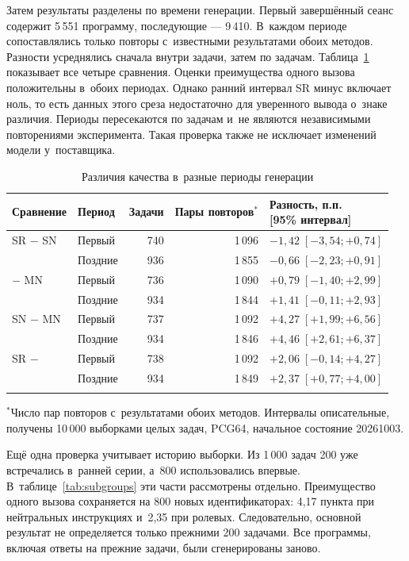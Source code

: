 Затем результаты разделены по времени генерации. Первый завершённый сеанс содержит 5\,551 программу, последующие --- 9\,410. В~каждом периоде сопоставлялись только повторы с~известными результатами обоих методов. Разности усреднялись сначала внутри задачи, затем по задачам. Таблица~\ref{tab:temporal} показывает все четыре сравнения. Оценки преимущества одного вызова положительны в~обоих периодах. Однако ранний интервал SR минус \MultiCallRole{} включает ноль, то есть данных этого среза недостаточно для уверенного вывода о~знаке различия. Периоды пересекаются по задачам и~не являются независимыми повторениями эксперимента. Такая проверка также не исключает изменений модели у~поставщика.

\begin{table}[htbp]
\caption{Различия качества в~разные периоды генерации}
\label{tab:temporal}
\centering\small\setlength{\tabcolsep}{4pt}
\begin{tabular}{@{}llrrl@{}}
\toprule
Сравнение & Период & Задачи & \shortstack{Пары\\повторов$^*$} & \shortstack{Разность, п.п.\\{}[95\% интервал]} \\
\midrule
SR $-$ SN & Первый & 740 & 1\,096 & $-1{,}42\;[-3{,}54;+0{,}74]$ \\
 & Поздние & 936 & 1\,855 & $-0{,}66\;[-2{,}23;+0{,}91]$ \\
\MultiCallRole{} $-$ MN & Первый & 736 & 1\,090 & $+0{,}79\;[-1{,}40;+2{,}99]$ \\
 & Поздние & 934 & 1\,844 & $+1{,}41\;[-0{,}11;+2{,}93]$ \\
SN $-$ MN & Первый & 737 & 1\,092 & $+4{,}27\;[+1{,}99;+6{,}56]$ \\
 & Поздние & 934 & 1\,846 & $+4{,}46\;[+2{,}61;+6{,}37]$ \\
SR $-$ \MultiCallRole{} & Первый & 738 & 1\,092 & $+2{,}06\;[-0{,}14;+4{,}27]$ \\
 & Поздние & 934 & 1\,849 & $+2{,}37\;[+0{,}77;+4{,}00]$ \\
\botrule
\end{tabular}
\par\smallskip\raggedright\footnotesize $^*$Число пар повторов с~результатами обоих методов. Интервалы описательные, получены 10\,000 выборками целых задач, PCG64, начальное состояние 20261003.
\end{table}
\FloatBarrier

Ещё одна проверка учитывает историю выборки. Из 1\,000 задач 200 уже встречались в~ранней серии, а~800 использовались впервые. В~таблице~\ref{tab:subgroups} эти части рассмотрены отдельно. Преимущество одного вызова сохраняется на 800 новых идентификаторах: 4,17 пункта при нейтральных инструкциях и~2,35 при ролевых. Следовательно, основной результат не определяется только прежними 200 задачами. Все программы, включая ответы на прежние задачи, были сгенерированы заново.

